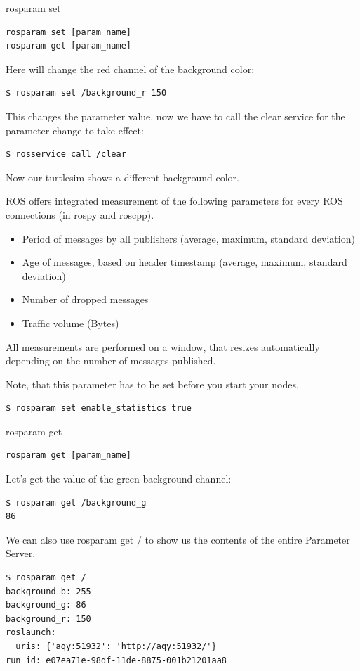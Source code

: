 \begin{frame}{rosparam set}
\begin{lstlisting}[language=syntax]
rosparam set [param_name]
rosparam get [param_name]
\end{lstlisting}
Here will change the red channel of the background color:

\begin{lstlisting}[language=shell]
$ rosparam set /background_r 150
\end{lstlisting}
This changes the parameter value, now we have to call the clear service for the parameter change to take effect:
\begin{lstlisting}[language=shell]
$ rosservice call /clear
\end{lstlisting}
Now our turtlesim shows a different background color.

\framebreak 

ROS  offers integrated measurement of the following parameters for every ROS connections (in rospy and roscpp).
\begin{itemize}
\item Period of messages by all publishers (average, maximum, standard deviation)
\item Age of messages, based on header timestamp (average, maximum, standard deviation)
\item Number of dropped messages
\item  Traffic volume (Bytes) 
\end{itemize}

\vspace{.2cm}
All measurements are performed on a window, that resizes automatically depending on the number of messages published.

\vspace{.2cm}
Note, that this parameter has to be set before you start your nodes.
\begin{lstlisting}[language=bash]
$ rosparam set enable_statistics true
\end{lstlisting}
\end{frame}

\begin{frame}[fragile]{rosparam get}
\begin{lstlisting}[language=syntax]
rosparam get [param_name]
\end{lstlisting}

Let's get the value of the green background channel:
\begin{lstlisting}[language=shell]
$ rosparam get /background_g 
86
\end{lstlisting}

We can also use rosparam get / to show us the contents of the entire Parameter Server.
\begin{lstlisting}[language=shell]
$ rosparam get /
background_b: 255
background_g: 86
background_r: 150
roslaunch:
  uris: {'aqy:51932': 'http://aqy:51932/'}
run_id: e07ea71e-98df-11de-8875-001b21201aa8
\end{lstlisting}
\end{frame}

